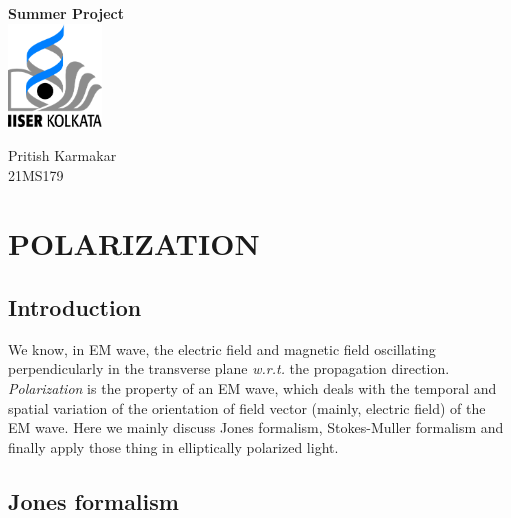 \documentclass[11pt,a4paper]{article}
\author{Pritish Karmakar}
\numberwithin{equation}{section}
\begin{document}
	\begin{titlepage}
		\vspace*{3.5cm}
		\centering
		{\Huge\bfseries Summer Project}\\
		\vspace{5cm}
		\includegraphics[width=2.5cm]{iiserk.png}

		\vspace{5cm}
		
		{\LARGE Pritish Karmakar\\}
		\vspace{0.3cm}
		{21MS179}
		\vfill
		
		
		\clearpage
		\tableofcontents
		\clearpage
		\listoffigures
		\listoftables
		
	\end{titlepage}


\section{POLARIZATION}
\subsection{Introduction}
We know, in EM wave, the electric field and magnetic field oscillating perpendicularly in the transverse plane \textit{w.r.t.} the propagation direction. \textit{Polarization} is the property of an EM wave, which deals with the temporal and spatial variation of the orientation of field vector (mainly,  electric field) of the EM wave. Here we mainly discuss Jones formalism, Stokes-Muller formalism and finally apply those thing in elliptically polarized light.

\subsection{Jones formalism}
\end{document}
